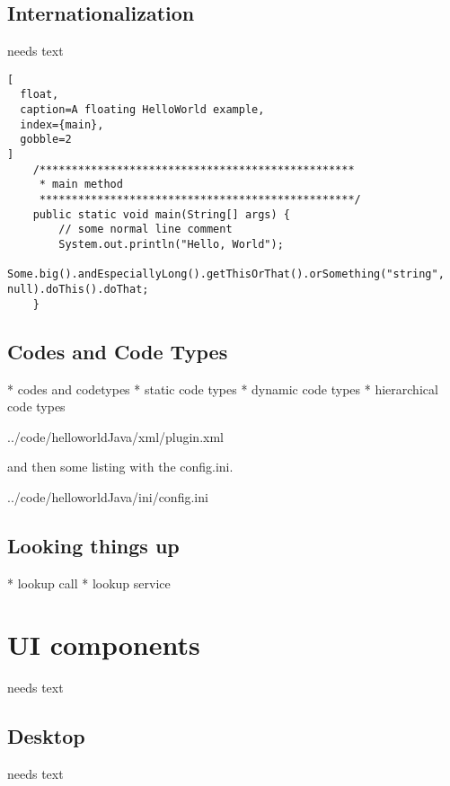 \documentclass[a4paper,10pt,twoside]{book}
\begin{document}
\section{Internationalization}
needs text

\begin{lstlisting}[
  float,
  caption=A floating HelloWorld example,
  index={main},
  gobble=2
]
    /*************************************************
     * main method
     *************************************************/
    public static void main(String[] args) {
        // some normal line comment
        System.out.println("Hello, World");
        Some.big().andEspeciallyLong().getThisOrThat().orSomething("string", null).doThis().doThat;
    }
\end{lstlisting}

\section{Codes and Code Types}
  * codes and codetypes
  * static code types
  * dynamic code types
  * hierarchical code types


{../code/helloworldJava/xml/plugin.xml}

and then some listing with the config.ini.


{../code/helloworldJava/ini/config.ini}

\section{Looking things up}
  * lookup call
  * lookup service

\chapter{UI components}
needs text

\section{Desktop}
needs text
\end{document}
